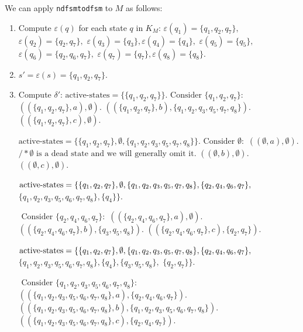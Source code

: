 \documentclass[hidelinks,12pt]{article}
\begin{document}
We can apply \texttt{ndfsmtodfsm} to \( M \) as follows:
\begin{enumerate}
    \item Compute \( \varepsilon(q) \) for each state $ q$ in $ K_M $:
        $ \varepsilon(q_1) = \{q_1, q_2, q_7\}, $
        $ \varepsilon(q_2) = \{q_2, q_7\}, $
        $ \varepsilon(q_3) = \{q_3\}, \varepsilon(q_4) = \{q_4\}, $
        $ \varepsilon(q_5) = \{q_5\}, $
        $ \varepsilon(q_6) = \{q_2, q_6, q_7\}, $
        $ \varepsilon(q_7) = \{q_7\}, \varepsilon(q_8) = \{q_8\}. $

    \item \( s' = \varepsilon(s) = \{q_1, q_2, q_7\} \).

    \item Compute \( \delta' \):
        $ \text{active-states} = \{\{q_1, q_2, q_7\}\}. 

        \text{ Consider } \{q_1, q_2, q_7\}: $
        $ ((\{q_1, q_2, q_7\}, a), \emptyset). $
        $ ((\{q_1, q_2, q_7\}, b), \{q_1, q_2, q_3, q_5, q_7, q_8\}). $
        $ ((\{q_1, q_2, q_7\}, c), \emptyset). $

        $ \text{active-states} = \{\{q_1, q_2, q_7\}, \emptyset, \{q_1, q_2, q_3, q_5, q_7, q_8\}\}. 

        \text{ Consider } \emptyset: $
        $ ((\emptyset, a), \emptyset). $
        $ /* \emptyset \text{ is a dead state and we will generally omit it.} $
        $ ((\emptyset, b), \emptyset). $
        $ ((\emptyset, c), \emptyset). $

        $ \text{active-states} = \{\{q_1, q_2, q_7\}, \emptyset,\\ \{q_1, q_2, q_3, q_5, q_7, q_8\}, \{q_2, q_4, q_6, q_7\}, $
        $ \{q_1, q_2, q_3, q_5, q_6, q_7, q_8\}, \{q_4\}\}.$ 

        $\text{ Consider } \{q_2, q_4, q_6, q_7\}: $
        $ ((\{q_2, q_4, q_6, q_7\}, a), \emptyset). $
        $ ((\{q_2, q_4, q_6, q_7\}, b), \{q_3, q_5, q_8\}). $
        $ ((\{q_2, q_4, q_6, q_7\}, c), \{q_2, q_7\}). $

        $ \text{active-states} = \{\{q_1, q_2, q_7\}, \emptyset,\\ \{q_1, q_2, q_3, q_5, q_7, q_8\}, \{q_2, q_4, q_6, q_7\}, $
        $ \{q_1, q_2, q_3, q_5, q_6, q_7, q_8\}, \{q_4\}, \{q_3, q_5, q_8\}, $
        $ \{q_2, q_7\}\}.$

        $ \text{ Consider } \{q_1, q_2, q_3, q_5, q_6, q_7, q_8\}: $
        $ ((\{q_1, q_2, q_3, q_5, q_6, q_7, q_8\}, a), \{q_2, q_4, q_6, q_7\}). $
        $ ((\{q_1, q_2, q_3, q_5, q_6, q_7, q_8\}, b), \{q_1, q_2, q_3, q_5, q_6, q_7, q_8\}). $
        $ ((\{q_1, q_2, q_3, q_5, q_6, q_7, q_8\}, c), \{q_2, q_4, q_7\}). $


\end{enumerate}
\end{document}
